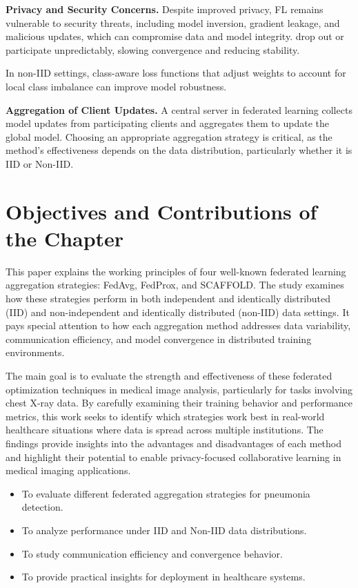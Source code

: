 \documentclass[12pt]{book}
\begin{document}
\textbf{Privacy and Security Concerns.}
Despite improved privacy, FL remains vulnerable to security threats, including model inversion, gradient leakage, and malicious updates, which can compromise data and model integrity. drop out or participate unpredictably, slowing convergence and reducing stability.

In non-IID settings, class-aware loss functions that adjust weights to account for local class imbalance can improve model robustness.

\textbf{Aggregation of Client Updates.}
A central server in federated learning collects model updates from participating clients and aggregates them to update the global model. Choosing an appropriate aggregation strategy is critical, as the method's effectiveness depends on the data distribution, particularly whether it is IID or Non-IID.

\section{Objectives and Contributions of the Chapter}

This paper explains the working principles of four well-known federated learning aggregation strategies: FedAvg, FedProx, and SCAFFOLD. The study examines how these strategies perform in both independent and identically distributed (IID) and non-independent and identically distributed (non-IID) data settings. It pays special attention to how each aggregation method addresses data variability, communication efficiency, and model convergence in distributed training environments.

The main goal is to evaluate the strength and effectiveness of these federated optimization techniques in medical image analysis, particularly for tasks involving chest X-ray data. By carefully examining their training behavior and performance metrics, this work seeks to identify which strategies work best in real-world healthcare situations where data is spread across multiple institutions. The findings provide insights into the advantages and disadvantages of each method and highlight their potential to enable privacy-focused collaborative learning in medical imaging applications.

\begin{itemize}
\item To evaluate different federated aggregation strategies for pneumonia detection.
\item To analyze performance under IID and Non-IID data distributions.
\item To study communication efficiency and convergence behavior.
\item To provide practical insights for deployment in healthcare systems.
\end{itemize}
\end{document}
